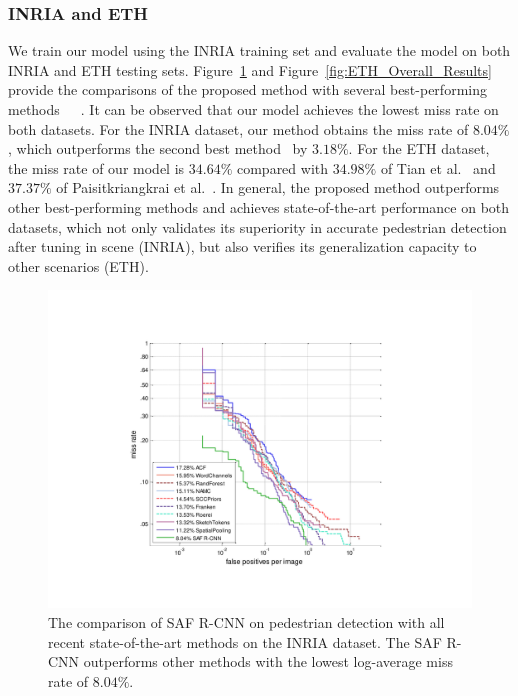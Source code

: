 \documentclass[journal]{IEEEtran}
\begin{document}
\subsubsection{INRIA and ETH}
We train our model using the INRIA training set and evaluate the model on both INRIA and ETH testing sets. Figure~\ref{fig:INRIA_Overall_Results} and Figure~\ref{fig:ETH_Overall_Results} provide the comparisons of the proposed method with several best-performing methods~\cite{paisitkriangkrai2014strengthening}~\cite{ta_cnn}~\cite{dollar2014fast}. It can be observed that our model achieves the lowest miss rate on both datasets. For the INRIA dataset, our method obtains the miss rate of $8.04\%$, which outperforms the second best method~\cite{paisitkriangkrai2014strengthening} by $3.18\%$. For the ETH dataset, the miss rate of our model is $34.64\%$ compared with $34.98\%$ of Tian et al.~\cite{ta_cnn} and $37.37\%$ of Paisitkriangkrai et al.~\cite{paisitkriangkrai2014strengthening}. In general, the proposed method outperforms other best-performing methods and achieves state-of-the-art performance on both datasets, which not only validates its superiority in accurate pedestrian detection after tuning in scene (INRIA), but also verifies its generalization capacity to other scenarios (ETH).

\begin{figure}
	\begin{center}
		\includegraphics[scale=0.45]{figures/INRIA_Overall_Results.pdf}
		\caption{{The comparison of SAF R-CNN on pedestrian detection with all recent state-of-the-art methods on the INRIA dataset. The SAF R-CNN outperforms other methods with the lowest log-average miss rate of $8.04\%$.}}
		\label{fig:INRIA_Overall_Results}
	\end{center}
	\vspace{-4mm}
\end{figure}
\end{document}
